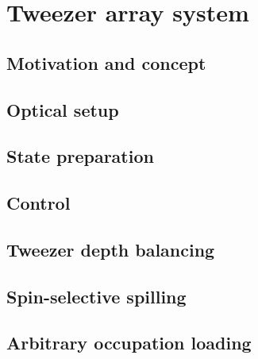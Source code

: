\documentclass[twoside]{article}
\begin{document}
\section{Tweezer array system} \label{sec:tweezer}

\subsection{Motivation and concept} \label{subsec:aodconcept}

\subsection{Optical setup}

\subsection{State preparation} \label{subsec:state-prepation}

\subsection{Control} \label{subsec:control}


\subsection{Tweezer depth balancing} \label{subsec:balancing}


\subsection{Spin-selective spilling} \label{subsec:spin-selective-spilling}


\subsection{Arbitrary occupation loading} \label{subsec:arbitrary-occupation-loading}



\newpage
\end{document}
